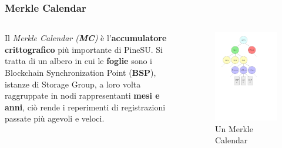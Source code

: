 \documentclass{beamer}
\begin{document}
\begin{frame}
	\frametitle{Merkle Calendar}
	\begin{columns}
		Il \emph{Merkle Calendar (\textbf{MC})} è l'\textbf{accumulatore crittografico}
		più importante di PineSU. Si tratta di un albero in cui le \textbf{foglie} sono
		i Blockchain Synchronization Point (\textbf{BSP}), istanze di
		Storage Group, a loro volta raggruppate in nodi rappresentanti
		\textbf{mesi e anni}, ciò rende i reperimenti di registrazioni passate
		più agevoli e veloci.
		\centering
		\begin{figure}
			\includegraphics[width=\textwidth]{figures/mc1.pdf}
			\caption{Un Merkle Calendar}
		\end{figure} 
	\end{columns}
\end{frame}
\end{document}
